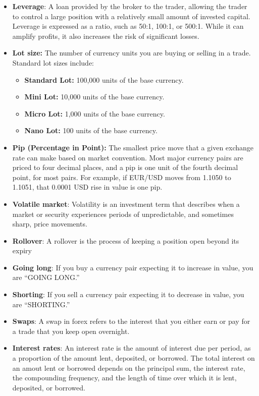 \documentclass{report}
\begin{document}
\begin{itemize}
         \item \textbf{Leverage}: A loan provided by the broker to the trader, allowing the trader to control a large position with a relatively small amount of invested capital. Leverage is expressed as a ratio, such as 50:1, 100:1, or 500:1. While it can amplify profits, it also increases the risk of significant losses.
         \item \textbf{Lot size:} The number of currency units you are buying or selling in a trade. Standard lot sizes include:
             \begin{itemize}
                 \item \textbf{Standard Lot:} 100,000 units of the base currency.
                 \item \textbf{Mini Lot:} 10,000 units of the base currency.
                 \item \textbf{Micro Lot:} 1,000 units of the base currency.
                 \item \textbf{Nano Lot:} 100 units of the base currency.
             \end{itemize}
            \item \textbf{Pip (Percentage in Point):}
                The smallest price move that a given exchange rate can make based on market convention. Most major currency pairs are priced to four decimal places, and a pip is one unit of the fourth decimal point, for most pairs. For example, if EUR/USD moves from 1.1050 to 1.1051, that 0.0001 USD rise in value is one pip.
            \item \textbf{Volatile market}: Volatility is an investment term that describes when a market or security experiences periods of unpredictable, and sometimes sharp, price movements.
        \item \textbf{Rollover}: A rollover is the process of keeping a position open beyond its expiry
        \item \textbf{Going long}: If you buy a currency pair expecting it to increase in value, you are “GOING LONG.”
        \item \textbf{Shorting}: If you sell a currency pair expecting it to decrease in value, you are “SHORTING.”
        \item \textbf{Swaps}: A swap in forex refers to the interest that you either earn or pay for a trade that you keep open overnight.
        \item \textbf{Interest rates}: An interest rate is the amount of interest due per period, as a proportion of the amount lent, deposited, or borrowed. The total interest on an amout lent or borrowed depends on the principal sum, the interest rate, the compounding frequency, and the length of time over which it is lent, deposited, or borrowed.

\end{itemize}
\end{document}
